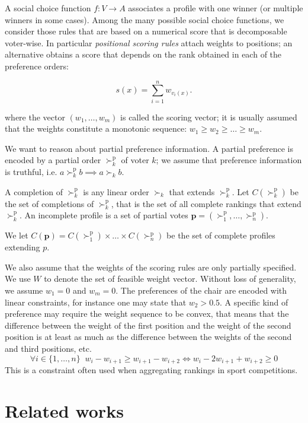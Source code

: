\documentclass[12pt]{article}
\newcommand{\pref}{{\succ}}%
\newcommand{\ppref}{\succ^\text{p}}%
\begin{document}
A social choice function $f : V \rightarrow A$ associates a profile with one winner (or multiple winners in some cases).
Among the many possible social choice functions, we consider those rules that are based on a numerical score that is decomposable voter-wise.
In particular {\em positional scoring rules} attach weights to positions; an alternative obtains a score that depends on the rank obtained in each of the preference orders:

\[ s(x) = \sum_{i=1}^{n} w_{v_i(x)}. \]

where the vector $(w_1,\ldots,w_m)$ is called the scoring vector;
 it is usually assumed that the weights constitute a monotonic sequence: $w_{1} \geq w_{2} \geq \ldots \geq w_{m}$.

\medskip
We want to reason about partial preference information.
A partial preference  is encoded by a partial order $\ppref_k$  of voter $k$;
we assume that preference information is truthful, i.e. $a \ppref_k b \implies a \pref_k b$.

A completion of $\ppref_k$ is any linear order $\pref_k$ that extends $\ppref_k$.
Let $C(\ppref_k)$ be the set of completions of $\ppref_k$, that is the set of all complete rankings that extend $\ppref_k$.
An incomplete profile is a set of partial votes %
$\textbf{p}=(\ppref_1,\ldots,\ppref_n)$.

We let $C(\textbf{p})=C(\ppref_1)\times \ldots \times C(\ppref_n)$ be the set of complete profiles extending $p$.

\medskip
We also assume that the weights of the scoring rules are only partially specified.
We use $W$ to denote the set of feasible weight vector.
Without loss of generality, we assume $w_1=0$ and $w_m=0$.
The preferences of the chair are encoded with linear constraints, for instance one may state
that $w_2>0.5$.
A specific kind of preference may require the weight sequence to be convex, that means that the difference between the weight of the first position and the weight of the second position is at least as much as the difference between the weights of the second and third positions, etc. 
\[ \forall i \in \{1,\ldots,n\} \;\; w_i - w_{i+1} \geq w_{i+1}-w_{i+2} \iff  w_i - 2 w_{i+1} + w_{i+2} \geq 0 \]
This is a constraint often used when aggregating rankings in sport competitions.

\section{Related works}
\end{document}
